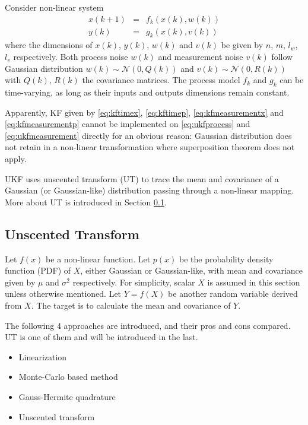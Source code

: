 Consider non-linear system
\begin{eqnarray}
	x(k+1) &=& f_k\left(x(k), w(k)\right) \label{eq:ukfprocess} \\
	y(k) &=& g_k\left(x(k), v(k)\right) \label{eq:ukfmeasurement}
\end{eqnarray}
where the dimensions of $x(k)$, $y(k)$, $w(k)$ and $v(k)$ be given by $n$, $m$, $l_w$, $l_v$ respectively. Both process noise $w(k)$ and measurement noise $v(k)$ follow Gaussian distribution $w(k)\sim \mathcal{N}\left(0,Q(k)\right)$ and $v(k)\sim \mathcal{N}\left(0,R(k)\right)$ with $Q(k)$, $R(k)$ the covariance matrices. The process model $f_k$ and $g_k$ can be time-varying, as long as their inputs and outputs dimensions remain constant.

Apparently, KF given by \eqref{eq:kftimex}, \eqref{eq:kftimep}, \eqref{eq:kfmeasurementx} and \eqref{eq:kfmeasurementp} cannot be implemented on \eqref{eq:ukfprocess} and \eqref{eq:ukfmeasurement} directly for an obvious reason: Gaussian distribution does not retain in a non-linear transformation where superposition theorem does not apply.

UKF uses unscented transform (UT) to trace the mean and covariance of a Gaussian (or Gaussian-like) distribution passing through a non-linear mapping. More about UT is introduced in Section \ref{sec:ut}.

\subsection{Unscented Transform} \label{sec:ut}

Let $f(x)$ be a non-linear function. Let $p(x)$ be the probability density function (PDF) of $X$, either Gaussian or Gaussian-like, with mean and covariance given by  $\mu$ and $\sigma^2$ respectively. For simplicity, scalar $X$ is assumed in this section unless otherwise mentioned. Let $Y=f(X)$ be another random variable derived from $X$. The target is to calculate the mean and covariance of $Y$.

The following 4 approaches are introduced, and their pros and cons compared. UT is one of them and will be introduced in the last.
\begin{itemize}
	\item Linearization
	\item Monte-Carlo based method
	\item Gauss-Hermite quadrature
	\item Unscented transform
\end{itemize}

